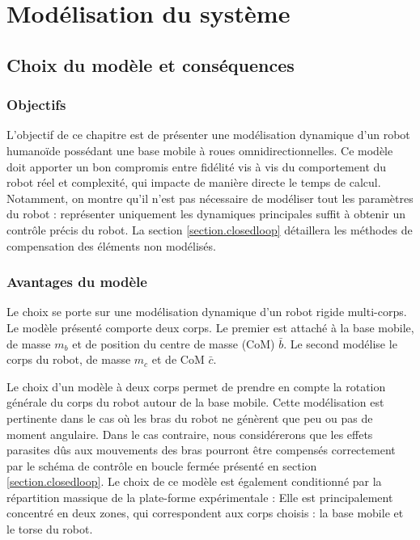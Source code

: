\chapter{Modélisation du système}
\label{chapitre.modele}
\section{Choix du modèle et conséquences}
	\subsection{Objectifs}
		L'objectif de ce chapitre est de présenter une modélisation dynamique d'un robot humanoïde possédant une base mobile à roues omnidirectionnelles. 
		Ce modèle doit apporter un bon compromis entre fidélité vis à vis du comportement du robot réel et complexité, qui impacte de manière directe le temps de calcul.
		Notamment, on montre qu'il n'est pas nécessaire de modéliser tout les paramètres du robot : représenter uniquement les dynamiques principales suffit à obtenir un contrôle précis du robot. 
		La section \ref{section.closedloop} détaillera les méthodes de compensation des éléments non modélisés.
	
		
	\subsection{Avantages du modèle}
		
		Le choix se porte sur une modélisation dynamique d'un robot rigide multi-corps. 
		Le modèle présenté  comporte deux corps. Le premier est attaché à la base mobile, de masse $m_b$ et de position du centre de masse (CoM) $\bar{b}$.
		Le second modélise le corps du robot, de masse $m_c$ et de CoM $\bar{c}$.
		
		Le choix d'un modèle à deux corps permet de prendre en compte la rotation générale du corps du robot autour de la base mobile.
		Cette modélisation est pertinente dans le cas où les bras du robot ne génèrent que peu ou pas de moment angulaire.
		Dans le cas contraire, nous considérerons que les effets parasites dûs aux mouvements des bras pourront être compensés correctement par le schéma de contrôle en boucle fermée présenté en section \ref{section.closedloop}.
		Le choix de ce modèle est également conditionné par la répartition massique de la plate-forme expérimentale :
		Elle est principalement concentré en deux zones, qui correspondent aux corps choisis : la base mobile et le torse du robot.	
	
